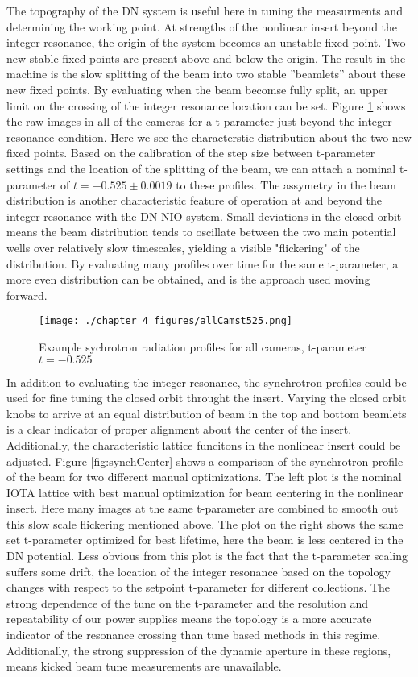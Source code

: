 The topography of the DN system is useful here in tuning the measurments and determining the working point. At strengths of the nonlinear insert beyond the integer resonance, the origin of the system becomes an unstable fixed point. Two new stable fixed points are present above and below the origin. The result in the machine is the slow splitting of the beam into two stable ”beamlets” about these new fixed points. By evaluating when the beam becomse fully split, an upper limit on the crossing of the integer resonance location can be set. Figure \ref{fig:allCams} shows the raw images in all of the cameras for a t-parameter just beyond the integer resonance condition. Here we see the characterstic distribution about the two new fixed points. Based on the calibration of the step size between t-parameter settings and the location of the splitting of the beam, we can attach a nominal t-parameter of $t=-0.525\pm0.0019$ to these profiles. The assymetry in the beam distribution is another characteristic feature of operation at and beyond the integer resonance with the DN NIO system. Small deviations in the closed orbit means the beam distribution tends to oscillate between the two main potential wells over relatively slow timescales, yielding a visible "flickering" of the distribution. By evaluating many profiles over time for the same t-parameter, a more even distribution can be obtained, and is the approach used moving forward.

\begin{figure}
	\centering
	\texttt{[image: ./chapter\_4\_figures/allCamst525.png]}
	\caption{Example sychrotron radiation profiles for all cameras, t-parameter $t=-0.525$}
	\label{fig:allCams}
\end{figure}

In addition to evaluating the integer resonance, the synchrotron profiles could be used for fine tuning the closed orbit throught the insert. Varying the closed orbit knobs to arrive at an equal distribution of beam in the top and bottom beamlets is a  clear indicator of proper alignment about the center of the insert. Additionally, the characteristic lattice funcitons in the nonlinear insert could be adjusted. Figure \ref{fig:synchCenter} shows a comparison of the synchrotron profile of the beam for two different manual optimizations. The left plot is the nominal IOTA lattice with best manual optimization for beam centering in the nonlinear insert. Here many images at the same t-parameter are combined to smooth out this slow scale flickering mentioned above. The plot on the right shows the same set t-parameter optimized for best lifetime, here the beam is less centered in the DN potential. Less obvious from this plot is the fact that the t-parameter scaling suffers some drift, the location of the integer resonance based on the topology changes with respect to the setpoint t-parameter for different collections. The strong dependence of the tune on the t-parameter and the resolution and repeatability of our power supplies means the topology is a more accurate indicator of the resonance crossing than tune based methods in this regime. Additionally, the strong suppression of the dynamic aperture in these regions, means kicked beam tune measurements are unavailable.

